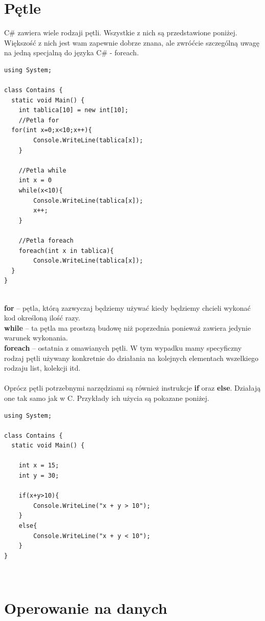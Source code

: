 \documentclass[a4paper]{article}
\theoremstyle{definition}
\begin{document}
\section{Pętle}
C\# zawiera wiele rodzaji pętli. Wszystkie z nich są przedstawione poniżej. Większość z nich jest wam zapewnie dobrze znana, ale zwróćcie szczególną uwagę na jedną specjalną do języka C\# - foreach.\\
\begin{lstlisting}[frame=single]
using System;

class Contains {
  static void Main() {
	int tablica[10] = new int[10];
	//Petla for
  for(int x=0;x<10;x++){
		Console.WriteLine(tablica[x]);
	}
	
	//Petla while
	int x = 0
	while(x<10){
		Console.WriteLine(tablica[x]);
		x++;
	}

	//Petla foreach
	foreach(int x in tablica){
		Console.WriteLine(tablica[x]);
  }
}
\end{lstlisting}\\
\textbf{for} – pętla, którą zazwyczaj będziemy używać kiedy będziemy chcieli wykonać kod określoną ilość razy.\\
\textbf{while} – ta pętla ma prostszą budowę niż poprzednia ponieważ zawiera jedynie warunek wykonania. \\
\textbf{foreach} – ostatnia z omawianych pętli. W tym wypadku mamy specyficzny rodzaj pętli używany konkretnie do działania na kolejnych elementach wszelkiego rodzaju list, kolekcji itd.\\
\\Oprócz pętli potrzebnymi narzędziami są również instrukcje \textbf{if} oraz \textbf{else}. Działają one tak samo jak w C. Przykłady ich użycia są pokazane poniżej.\\
\begin{lstlisting}[frame=single]
using System;

class Contains {
  static void Main() {

	int x = 15;
	int y = 30;

	if(x+y>10){
		Console.WriteLine("x + y > 10");
	}
	else{
		Console.WriteLine("x + y < 10");
	}
}
\end{lstlisting}\\
\pagebreak
\section{Operowanie na danych}
\end{document}
